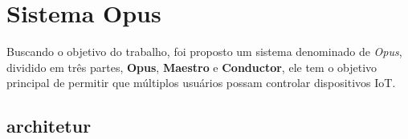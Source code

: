 \chapter{Sistema Opus}

Buscando o objetivo do trabalho, foi proposto um sistema denominado de \emph{Opus}, dividido em três partes, 
\textbf{Opus}, \textbf{Maestro} e \textbf{Conductor}, ele tem o objetivo principal de permitir que múltiplos usuários
possam controlar dispositivos IoT.

\section{architetur}

